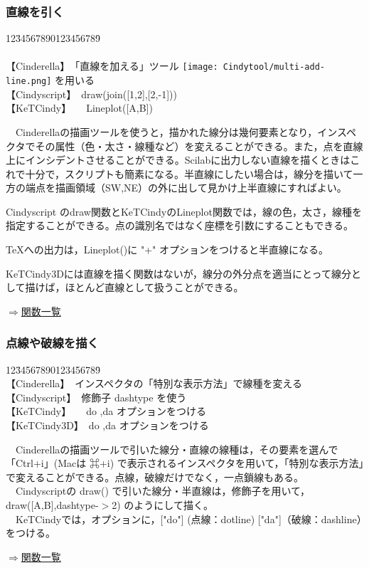 \documentclass[papersize,a4paper,12pt,uplatex]{jsarticle}
\begin{document}
\subsubsection{直線を引く}

\begin{tabbing}
12\=34567890123456789\=\kill\\
　\\
\>【Cinderella】　\>「直線を加える」ツール \texttt{[image: Cindytool/multi-add-line.png]} を用いる　\\ 
\>【Cindyscript】　\>draw(join([1,2],[2,-1]))\\
 \>【KeTCindy】　　\>Lineplot([A,B])　\\
\end{tabbing}
　Cinderellaの描画ツールを使うと，描かれた線分は幾何要素となり，インスペクタでその属性（色・太さ・線種など）を変えることができる。また，点を直線上にインシデントさせることができる。Scilabに出力しない直線を描くときはこれで十分で，スクリプトも簡素になる。半直線にしたい場合は，線分を描いて一方の端点を描画領域（SW,NE）の外に出して見かけ上半直線にすればよい。

Cindyscript のdraw関数とKeTCindyのLineplot関数では，線の色，太さ，線種を指定することができる。点の識別名ではなく座標を引数にすることもできる。

TeXへの出力は，Lineplot()に "+" オプションをつけると半直線になる。

KeTCindy3Dには直線を描く関数はないが，線分の外分点を適当にとって線分として描けば，ほとんど直線として扱うことができる。
\begin{flushright} \hyperlink{functionlist3d}{$\Rightarrow$関数一覧}\end{flushright}



\subsubsection{点線や破線を描く}

\begin{tabbing}
12\=34567890123456789\=\kill\\

\>【Cinderella】　\>インスペクタの「特別な表示方法」で線種を変える　\\ 
\>【Cindyscript】　\>修飾子 dashtype を使う　\\
 \>【KeTCindy】　　\>do ,da オプションをつける\\
 \>【KeTCindy3D】　\>do ,da オプションをつける\\
\end{tabbing}
　Cinderellaの描画ツールで引いた線分・直線の線種は，その要素を選んで「Ctrl+i」(Macは ⌘+i) で表示されるインスペクタを用いて，「特別な表示方法」で変えることができる。点線，破線だけでなく，一点鎖線もある。\\
　Cindyscriptの draw() で引いた線分・半直線は，修飾子を用いて， draw([A,B],dashtype-$>$2) のようにして描く。\\
　KeTCindyでは，オプションに，["do"] (点線：dotline) ["da"]（破線：dashline）をつける。
\begin{flushright} \hyperlink{functionlist3d}{$\Rightarrow$関数一覧}\end{flushright}
\end{document}
